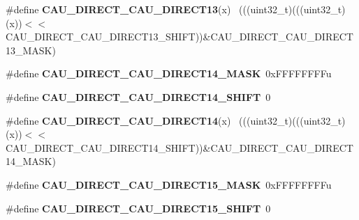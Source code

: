 \begin{DoxyCompactItemize}
\item 
\hypertarget{group___c_a_u___register___masks_gab8ff9896fac0205169ac83873b023062}{}\#define {\bfseries C\+A\+U\+\_\+\+D\+I\+R\+E\+C\+T\+\_\+\+C\+A\+U\+\_\+\+D\+I\+R\+E\+C\+T13}(x)                          ~(((uint32\+\_\+t)(((uint32\+\_\+t)(x))$<$$<$C\+A\+U\+\_\+\+D\+I\+R\+E\+C\+T\+\_\+\+C\+A\+U\+\_\+\+D\+I\+R\+E\+C\+T13\+\_\+\+S\+H\+I\+F\+T))\&C\+A\+U\+\_\+\+D\+I\+R\+E\+C\+T\+\_\+\+C\+A\+U\+\_\+\+D\+I\+R\+E\+C\+T13\+\_\+\+M\+A\+S\+K)\label{group___c_a_u___register___masks_gab8ff9896fac0205169ac83873b023062}

\item 
\hypertarget{group___c_a_u___register___masks_ga8145212bbedada0193bfa6042ea637a6}{}\#define {\bfseries C\+A\+U\+\_\+\+D\+I\+R\+E\+C\+T\+\_\+\+C\+A\+U\+\_\+\+D\+I\+R\+E\+C\+T14\+\_\+\+M\+A\+S\+K}~0x\+F\+F\+F\+F\+F\+F\+F\+Fu\label{group___c_a_u___register___masks_ga8145212bbedada0193bfa6042ea637a6}

\item 
\hypertarget{group___c_a_u___register___masks_ga017a8a273655c5f491aa2b348b1ed9bc}{}\#define {\bfseries C\+A\+U\+\_\+\+D\+I\+R\+E\+C\+T\+\_\+\+C\+A\+U\+\_\+\+D\+I\+R\+E\+C\+T14\+\_\+\+S\+H\+I\+F\+T}~0\label{group___c_a_u___register___masks_ga017a8a273655c5f491aa2b348b1ed9bc}

\item 
\hypertarget{group___c_a_u___register___masks_ga793ada1ff860fa8d66dd22a1df071581}{}\#define {\bfseries C\+A\+U\+\_\+\+D\+I\+R\+E\+C\+T\+\_\+\+C\+A\+U\+\_\+\+D\+I\+R\+E\+C\+T14}(x)                          ~(((uint32\+\_\+t)(((uint32\+\_\+t)(x))$<$$<$C\+A\+U\+\_\+\+D\+I\+R\+E\+C\+T\+\_\+\+C\+A\+U\+\_\+\+D\+I\+R\+E\+C\+T14\+\_\+\+S\+H\+I\+F\+T))\&C\+A\+U\+\_\+\+D\+I\+R\+E\+C\+T\+\_\+\+C\+A\+U\+\_\+\+D\+I\+R\+E\+C\+T14\+\_\+\+M\+A\+S\+K)\label{group___c_a_u___register___masks_ga793ada1ff860fa8d66dd22a1df071581}

\item 
\hypertarget{group___c_a_u___register___masks_gabd722971e5e62de19fda379b987cf321}{}\#define {\bfseries C\+A\+U\+\_\+\+D\+I\+R\+E\+C\+T\+\_\+\+C\+A\+U\+\_\+\+D\+I\+R\+E\+C\+T15\+\_\+\+M\+A\+S\+K}~0x\+F\+F\+F\+F\+F\+F\+F\+Fu\label{group___c_a_u___register___masks_gabd722971e5e62de19fda379b987cf321}

\item 
\hypertarget{group___c_a_u___register___masks_ga33f80687a392b95e7b5a8d15530cc2cf}{}\#define {\bfseries C\+A\+U\+\_\+\+D\+I\+R\+E\+C\+T\+\_\+\+C\+A\+U\+\_\+\+D\+I\+R\+E\+C\+T15\+\_\+\+S\+H\+I\+F\+T}~0\label{group___c_a_u___register___masks_ga33f80687a392b95e7b5a8d15530cc2cf}


\end{DoxyCompactItemize}

